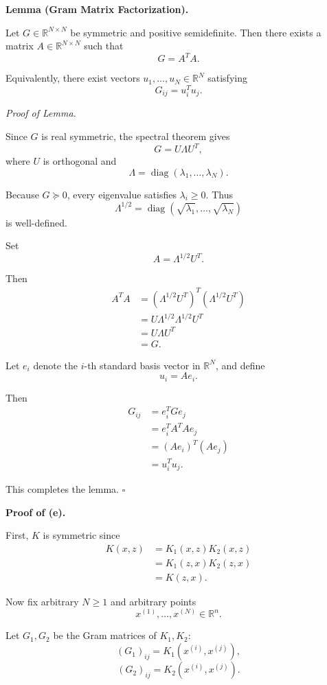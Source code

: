 \documentclass[11pt]{article}
\begin{document}
\medskip
\noindent\textbf{Lemma (Gram Matrix Factorization).}

Let $G\in\mathbb R^{N\times N}$ be symmetric and
positive semidefinite. Then there exists a matrix
$A\in\mathbb R^{N\times N}$ such that
\[
\boxed{G=A^TA.}
\]

Equivalently, there exist vectors
$u_1,\ldots,u_N\in\mathbb R^N$ satisfying
\[
G_{ij}=u_i^Tu_j.
\]

\textit{Proof of Lemma.}

Since $G$ is real symmetric, the spectral theorem
gives
\[
G=U\Lambda U^T,
\]
where $U$ is orthogonal and
\[
\Lambda=\operatorname{diag}
(\lambda_1,\ldots,\lambda_N).
\]

Because $G\succeq0$, every eigenvalue satisfies
$\lambda_i\geq0$. Thus
\[
\Lambda^{1/2}
=
\operatorname{diag}
(\sqrt{\lambda_1},\ldots,\sqrt{\lambda_N})
\]
is well-defined.

Set
\[
A=\Lambda^{1/2}U^T.
\]

Then
\[
\begin{aligned}
A^TA
&=(\Lambda^{1/2}U^T)^T
  (\Lambda^{1/2}U^T)\\
&=U\Lambda^{1/2}\Lambda^{1/2}U^T\\
&=U\Lambda U^T\\
&=G.
\end{aligned}
\]

Let $e_i$ denote the $i$-th standard basis vector
in $\mathbb R^N$, and define
\[
u_i=Ae_i.
\]

Then
\[
\begin{aligned}
G_{ij}
&=e_i^TGe_j\\
&=e_i^TA^TAe_j\\
&=(Ae_i)^T(Ae_j)\\
&=u_i^Tu_j.
\end{aligned}
\]

This completes the lemma.
\hfill$\square$

\medskip
\noindent\textbf{Proof of (e).}

First, $K$ is symmetric since
\[
\begin{aligned}
K(x,z)
&=K_1(x,z)K_2(x,z)\\
&=K_1(z,x)K_2(z,x)\\
&=K(z,x).
\end{aligned}
\]

Now fix arbitrary $N\geq1$ and arbitrary points
\[
x^{(1)},\ldots,x^{(N)}\in\mathbb R^n.
\]

Let $G_1,G_2$ be the Gram matrices of $K_1,K_2$:
\[
(G_1)_{ij}=K_1(x^{(i)},x^{(j)}),
\]
\[
(G_2)_{ij}=K_2(x^{(i)},x^{(j)}).
\]
\end{document}
